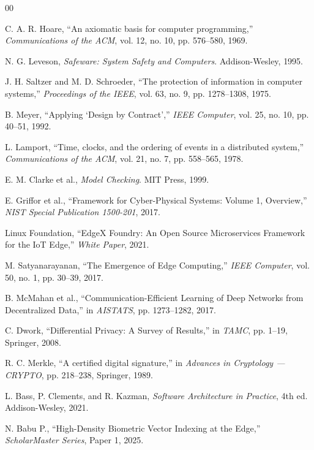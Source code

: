 \documentclass[conference]{IEEEtran}
\begin{document}
\begin{thebibliography}{00}

 C. A. R. Hoare, ``An axiomatic basis for computer programming,'' \textit{Communications of the ACM}, vol. 12, no. 10, pp. 576--580, 1969.

 N. G. Leveson, \textit{Safeware: System Safety and Computers}. Addison-Wesley, 1995.

 J. H. Saltzer and M. D. Schroeder, ``The protection of information in computer systems,'' \textit{Proceedings of the IEEE}, vol. 63, no. 9, pp. 1278--1308, 1975.

 B. Meyer, ``Applying `Design by Contract','' \textit{IEEE Computer}, vol. 25, no. 10, pp. 40--51, 1992.

 L. Lamport, ``Time, clocks, and the ordering of events in a distributed system,'' \textit{Communications of the ACM}, vol. 21, no. 7, pp. 558--565, 1978.

 E. M. Clarke et al., \textit{Model Checking}. MIT Press, 1999.

 E. Griffor et al., ``Framework for Cyber-Physical Systems: Volume 1, Overview,'' \textit{NIST Special Publication 1500-201}, 2017.

 Linux Foundation, ``EdgeX Foundry: An Open Source Microservices Framework for the IoT Edge,'' \textit{White Paper}, 2021.

 M. Satyanarayanan, ``The Emergence of Edge Computing,'' \textit{IEEE Computer}, vol. 50, no. 1, pp. 30--39, 2017.

 B. McMahan et al., ``Communication-Efficient Learning of Deep Networks from Decentralized Data,'' in \textit{AISTATS}, pp. 1273--1282, 2017.

 C. Dwork, ``Differential Privacy: A Survey of Results,'' in \textit{TAMC}, pp. 1--19, Springer, 2008.

 R. C. Merkle, ``A certified digital signature,'' in \textit{Advances in Cryptology --- CRYPTO}, pp. 218--238, Springer, 1989.

 L. Bass, P. Clements, and R. Kazman, \textit{Software Architecture in Practice}, 4th ed. Addison-Wesley, 2021.

 N. Babu P., ``High-Density Biometric Vector Indexing at the Edge,'' \textit{ScholarMaster Series}, Paper 1, 2025.


\end{thebibliography}
\end{document}
